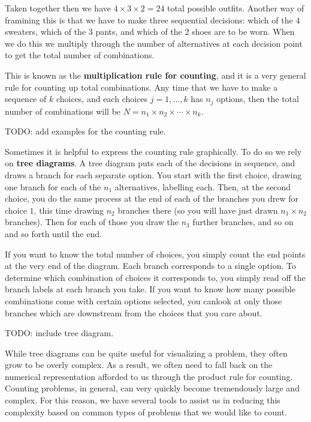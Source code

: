 \documentclass[
  letterpaper,
  DIV=11,
  numbers=noendperiod]{scrreprt}
\begin{document}
Taken together then we have \(4\times 3\times 2 = 24\) total possible
outfits. Another way of framining this is that we have to make three
sequential decisions: which of the \(4\) sweaters, which of the \(3\)
pants, and which of the \(2\) shoes are to be worn. When we do this we
multiply through the number of alternatives at each decision point to
get the total number of combinations.

This is known as the \textbf{multiplication rule for counting}, and it
is a very general rule for counting up total combinations. Any time that
we have to make a sequence of \(k\) choices, and each choices
\(j=1,\dots,k\) has \(n_j\) options, then the total number of
combinations will be \(N = n_1\times n_2\times\cdots\times n_k\).

TODO: add examples for the counting rule.

Sometimes it is helpful to express the counting rule graphically. To do
so we rely on \textbf{tree diagrams}. A tree diagram puts each of the
decisions in sequence, and draws a branch for each separate option. You
start with the first choice, drawing one branch for each of the \(n_1\)
alternatives, labelling each. Then, at the second choice, you do the
same process at the end of each of the branches you drew for choice
\(1\), this time drawing \(n_2\) branches there (so you will have just
drawn \(n_1\times n_2\) branches). Then for each of those you draw the
\(n_3\) further branches, and so on and so forth until the end.

If you want to know the total number of choices, you simply count the
end points at the very end of the diagram. Each branch corresponds to a
single option. To determine which combination of choices it corresponds
to, you simply read off the branch labels at each branch you take. If
you want to know how many possible combinations come with certain
options selected, you canlook at only those branches which are
downstream from the choices that you care about.

TODO: include tree diagram.

While tree diagrams can be quite useful for visualizing a problem, they
often grow to be overly complex. As a result, we often need to fall back
on the numerical representation afforded to us through the product rule
for counting. Counting problems, in general, can very quickly become
tremendously large and complex. For this reason, we have several tools
to assist us in reducing this complexity based on common types of
problems that we would like to count.
\end{document}
